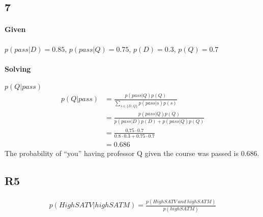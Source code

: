 \documentclass{article}
\begin{document}
\newpage
\subsection*{7}
\paragraph{Given} $p(pass|D) = 0.85$, $p(pass|Q) = 0.75$, $p(D)=0.3$, $p(Q)=0.7$
\paragraph{Solving} $p(Q|pass)$
\begin{align*}
	p(Q|pass) &= \frac{p(pass|Q)p(Q)}{\sum_{s\in\{D, Q\}}p(pass|s)p(s)} \\
						&= \frac{p(pass|Q)p(Q)}{p(pass|D)p(D) + p(pass|Q)p(Q)} \\
						&= \frac{0.75\cdot 0.7}{0.8\cdot 0.3 + 0.75 \cdot 0.7} \\
						&= 0.686
\end{align*}
The probability of ``you'' having professor Q given the course was passed is
$0.686$.

\subsection*{R5}
\begin{align*}
	p(HighSATV | highSATM) = \frac{p(HighSATV\ and\ highSATM)}{p(highSATM)}
\end{align*}
\end{document}
